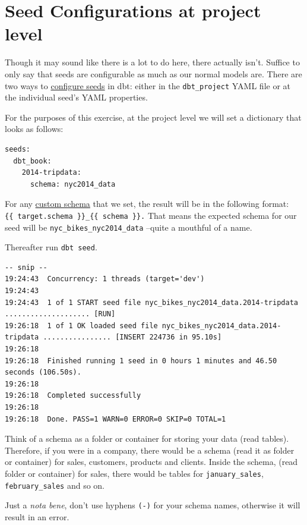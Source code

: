 \documentclass[
]{book}
\begin{document}
\hypertarget{seed-configurations-at-project-level}{%
\section{Seed Configurations at project level}\label{seed-configurations-at-project-level}}

Though it may sound like there is a lot to do here, there actually isn't. Suffice to only say that seeds are configurable as much as our normal models are. There are two ways to \href{https://docs.getdbt.com/reference/seed-configs}{configure seeds} in dbt: either in the \texttt{dbt\_project} YAML file or at the individual seed's YAML properties.

For the purposes of this exercise, at the project level we will set a dictionary that looks as follows:

\begin{verbatim}
seeds:
  dbt_book:
    2014-tripdata:
      schema: nyc2014_data
\end{verbatim}

For any \href{https://docs.getdbt.com/reference/resource-configs/schema}{custom schema} that we set, the result will be in the following format: \texttt{\{\{\ target.schema\ \}\}\_\{\{\ schema\ \}\}.} That means the expected schema for our seed will be \texttt{nyc\_bikes\_nyc2014\_data} --quite a mouthful of a name.

Thereafter run \texttt{dbt\ seed}.

\begin{verbatim}
-- snip --
19:24:43  Concurrency: 1 threads (target='dev')
19:24:43  
19:24:43  1 of 1 START seed file nyc_bikes_nyc2014_data.2014-tripdata .................... [RUN]
19:26:18  1 of 1 OK loaded seed file nyc_bikes_nyc2014_data.2014-tripdata ................ [INSERT 224736 in 95.10s]
19:26:18  
19:26:18  Finished running 1 seed in 0 hours 1 minutes and 46.50 seconds (106.50s).
19:26:18  
19:26:18  Completed successfully
19:26:18  
19:26:18  Done. PASS=1 WARN=0 ERROR=0 SKIP=0 TOTAL=1
\end{verbatim}

Think of a schema as a folder or container for storing your data (read tables). Therefore, if you were in a company, there would be a schema (read it as folder or container) for sales, customers, products and clients. Inside the schema, (read folder or container) for sales, there would be tables for \texttt{january\_sales}, \texttt{february\_sales} and so on.

Just a \emph{nota bene}, don't use hyphens \texttt{(-)} for your schema names, otherwise it will result in an error.
\end{document}
